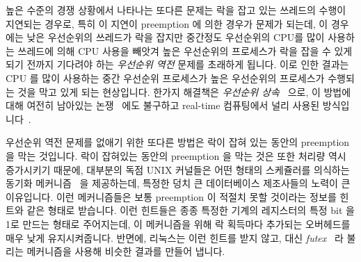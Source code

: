 높은 수준의 경쟁 상황에서 나타나는 또다른 문제는 락을 잡고 있는 쓰레드의 수행이
지연되는 경우로, 특히 이 지연이 preemption 에 의한 경우가 문제가 되는데, 이
경우에는 낮은 우선순위의 쓰레드가 락을 잡지만 중간정도 우선순위의 CPU를 많이
사용하는 쓰레드에 의해 CPU 사용을 빼앗겨 높은 우선순위의 프로세스가 락을 잡을
수 있게 되기 전까지 기다려야 하는 \emph{우선순위 역전} 문제를 초래하게 됩니다.
이로 인한 결과는 CPU 를 많이 사용하는 중간 우선순위 프로세스가 높은 우선순위의
프로세스가 수행되는 것을 막고 있게 되는 현상입니다.
한가지 해결책은 \emph{우선순위 상속}~\cite{Lampson1980Mesa} 으로, 이 방법에
대해 여전히 남아있는 논쟁~\cite{Yodaiken2004FSM,DougLocke2002a} 에도 불구하고
real-time 컴퓨팅에서 널리 사용된
방식입니다~\cite{Sha1990IEEETransComp,JonathanCorbet2006PriorityInheritance}.

우선순위 역전 문제를 없애기 위한 또다른 방법은 락이 잡혀 있는 동안의 preemption
을 막는 것입니다.
락이 잡혀있는 동안의 preemption 을 막는 것은 또한 처리량 역시 증가시키기
때문에, 대부분의 독점 UNIX 커널들은 어떤 형태의 스케쥴러를 의식하는 동기화
메커니즘~\cite{Kontothanassis97a} 을 제공하는데, 특정한 덩치 큰 데이터베이스
제조사들의 노력이 큰 이유입니다.
이런 메커니즘들은 보통 preemption 이 적절치 못할 것이라는 정보를 힌트와 같은
형태로 받습니다.
이런 힌트들은 종종 특정한 기계의 레지스터의 특정 bit 을 1로 만드는 형태로
주어지는데, 이 메커니즘을 위해 락 획득마다 추가되는 오버헤드를 매우 낮게
유지시켜줍니다.
반면에, 리눅스는 이런 힌트를 받지 않고, 대신
\emph{futex}~\cite{HubertusFrancke2002Futex,IngoMolnar2006RobustFutexes,StevenRostedt2006piFutexes,UlrichDrepper2011Futexes}
라 불리는 메커니즘을 사용해 비슷한 결과를 만들어 냅니다.
\iffalse

